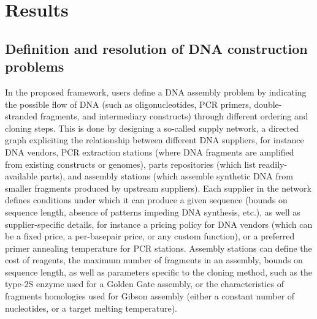 \section{Results}

\subsection{Definition and resolution of DNA construction problems}

In the proposed framework, users define a DNA assembly problem by indicating the possible flow of DNA (such as oligonucleotides, PCR primers, double-stranded fragments, and intermediary constructs) through different ordering and cloning steps. This is done by designing a so-called supply network, a directed graph expliciting the relationship between different DNA suppliers, for instance DNA vendors, PCR extraction stations (where DNA fragments are amplified from existing constructs or genomes), parts repositories (which list readily-available parts), and assembly stations (which assemble synthetic DNA from smaller fragments produced by upstream suppliers).
Each supplier in the network defines conditions under which it can produce a given sequence (bounds on sequence length, absence of patterns impeding DNA synthesis, etc.), as well as supplier-specific details, for instance a pricing policy for DNA vendors (which can be a fixed price, a per-basepair price, or any custom function), or a preferred primer annealing temperature for PCR stations. Assembly stations can define the cost of reagents, the maximum number of fragments in an assembly, bounds on sequence length, as well as parameters specific to the cloning method, such as the type-2S enzyme used for a Golden Gate assembly, or the characteristics of fragments homologies used for Gibson assembly (either a constant number of nucleotides, or a target melting temperature).

